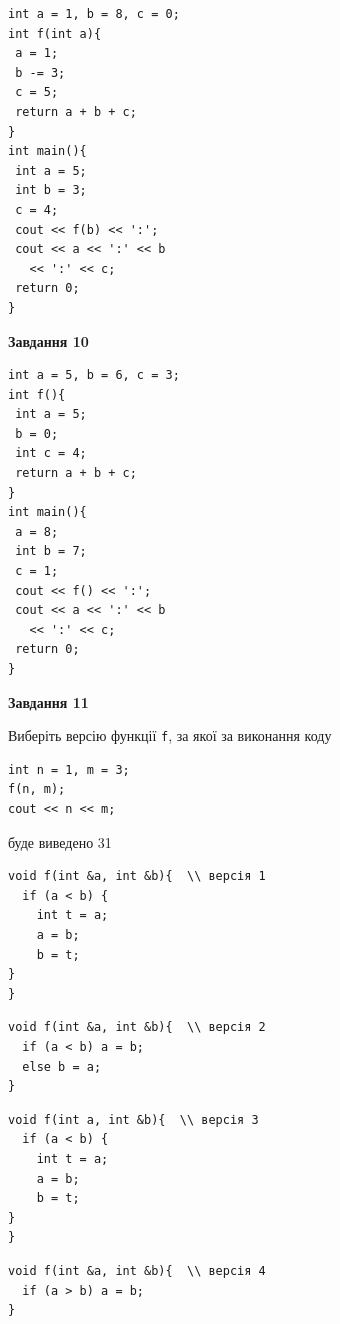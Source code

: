 \documentclass[12pt, ukrainian]{article}
\def\code#1{\Verb!#1!}
\begin{document}
{\begin {large}
\begin{minipage}[t]{7.0cm}
\begin{verbatim}
int a = 1, b = 8, c = 0;
int f(int a){
 a = 1;
 b -= 3;
 c = 5;
 return a + b + c;
}
int main(){
 int a = 5;
 int b = 3;
 c = 4;
 cout << f(b) << ':';
 cout << a << ':' << b 
   << ':' << c;
 return 0;
}
\end{verbatim}



\begin{center}
\textbf{Завдання 10}
\end{center}
\vspace{-8mm}

\begin{verbatim}
int a = 5, b = 6, c = 3;
int f(){
 int a = 5;
 b = 0;
 int c = 4;
 return a + b + c;
}
int main(){
 a = 8;
 int b = 7;
 c = 1;
 cout << f() << ':';
 cout << a << ':' << b 
   << ':' << c;
 return 0;
}
\end{verbatim}

\end{minipage}
\vline \hspace{1mm}
\begin{minipage}[t]{11.0cm}

\begin{center}
\textbf{Завдання 11}
\end{center}
Виберіть версію функції \code{f}, за якої за виконання коду
\begin{verbatim}
int n = 1, m = 3;
f(n, m);
cout << n << m;
\end{verbatim}

буде виведено 31

\begin{verbatim}
void f(int &a, int &b){  \\ версія 1
  if (a < b) {
    int t = a;
    a = b;
    b = t;
}  
}
\end{verbatim}

\vspace{-8mm}\begin{verbatim}
void f(int &a, int &b){  \\ версія 2
  if (a < b) a = b;
  else b = a;
}
\end{verbatim}

\vspace{-8mm}\begin{verbatim}
void f(int a, int &b){  \\ версія 3
  if (a < b) {
    int t = a;
    a = b;
    b = t;
}  
}
\end{verbatim}

\vspace{-8mm}\begin{verbatim}
void f(int &a, int &b){  \\ версія 4
  if (a > b) a = b;
}
\end{verbatim}




\end{minipage}
\end{large}}
\end{document}
